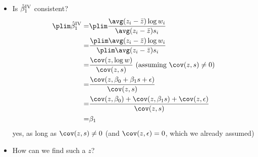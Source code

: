 \begin{frame}[allowframebreaks]
\begin{itemize}
    \begin{align*}
      \biv_1 = \frac{ \avg (z_i - \bar{z}) \log w_i } { \avg (z_i -
        \bar{z}) s_i } \text{ and } \biv_0 = \overline{\log w} -
      \biv_1 \bar{s}
    \end{align*}
    they are called \alert{instrumental variables (IV) estimators}     
  \item Is ${\hat{\beta}^{\mathrm{IV}}}_1$ consistent?
    \begin{align*} 
      \plim \biv_1 = & \plim  \frac{ \avg (z_i - \bar{z}) \log w_i } { \avg (z_i -
        \bar{z}) s_i }  \\
      = & \frac{\plim  \avg (z_i - \bar{z}) \log w_i } {\plim  \avg (z_i -
        \bar{z}) s_i } \\
      = &  \frac{\cov(z,\log w)}{\cov(z,s)} \text{ (assuming
        $\cov(z,s) \neq 0$)} \\
      = & \frac{\cov(z, \beta_0 + \beta_1 s + \epsilon)} {\cov(z,s)}
      \\
      = & \frac{\cov(z, \beta_0) + \cov(z,\beta_1 s) +
        \cov(z,\epsilon)} {\cov(z,s)} \\
      = & \beta_1
    \end{align*}
    yes, as long as $\cov(z,s) \neq 0$ (and $\cov(z,\epsilon) = 0$,
    which we already assumed)
  \item How can we find such a $z$?
  \end{itemize}
\end{frame}

